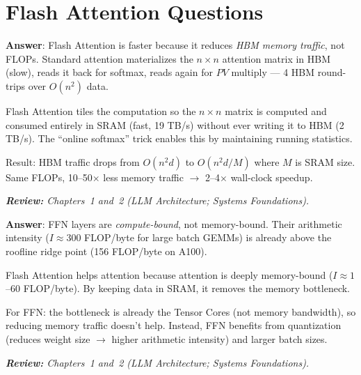 \section{Flash Attention Questions}
\label{flash-attention-questions}

\begin{questionbox}
\textbf{Answer}: Flash Attention is faster because it reduces \emph{HBM memory traffic}, not FLOPs. Standard attention materializes the $n \times n$ attention matrix in HBM (slow), reads it back for softmax, reads again for $PV$ multiply --- 4 HBM round-trips over $O(n^2)$ data.

Flash Attention tiles the computation so the $n \times n$ matrix is computed and consumed entirely in SRAM (fast, 19 TB/s) without ever writing it to HBM (2 TB/s). The ``online softmax'' trick enables this by maintaining running statistics.

Result: HBM traffic drops from $O(n^2 d)$ to $O(n^2 d / M)$ where $M$ is SRAM size. Same FLOPs, 10--50$\times$ less memory traffic $\to$ 2--4$\times$ wall-clock speedup.

\emph{\textbf{Review:} Chapters~1 and~2 (LLM Architecture; Systems Foundations).}
\end{questionbox}

\begin{questionbox}
\textbf{Answer}: FFN layers are \emph{compute-bound}, not memory-bound. Their arithmetic intensity ($I \approx 300$ FLOP/byte for large batch GEMMs) is already above the roofline ridge point (156 FLOP/byte on A100).

Flash Attention helps attention because attention is deeply memory-bound ($I \approx 1$--$60$ FLOP/byte). By keeping data in SRAM, it removes the memory bottleneck.

For FFN: the bottleneck is already the Tensor Cores (not memory bandwidth), so reducing memory traffic doesn’t help. Instead, FFN benefits from quantization (reduces weight size $\to$ higher arithmetic intensity) and larger batch sizes.

\emph{\textbf{Review:} Chapters~1 and~2 (LLM Architecture; Systems Foundations).}
\end{questionbox}

